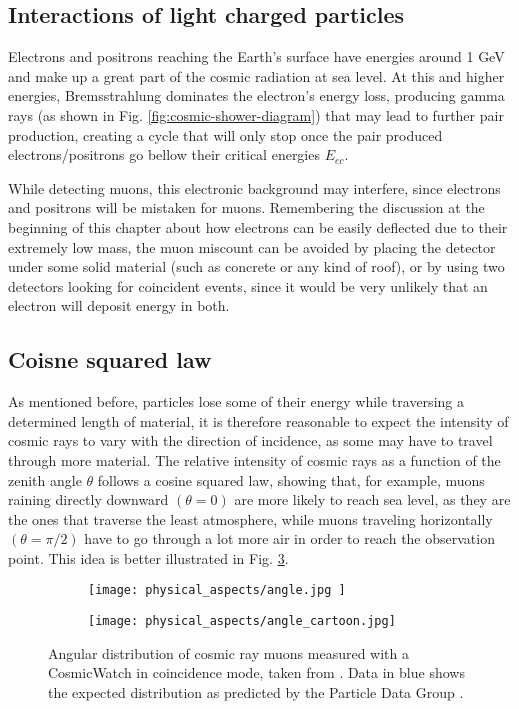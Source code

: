 \subsection{Interactions of light charged particles}

Electrons and positrons reaching the Earth's surface have energies around 1 \unit{\giga\eV} and make up a great part of the cosmic radiation at sea level. At this and higher energies, Bremsstrahlung dominates the electron's energy loss, producing gamma rays (as shown in Fig. \ref{fig:cosmic-shower-diagram}) that may lead to further pair production, creating a cycle that will only stop once the pair produced electrons/positrons go bellow their critical energies $E_{ec}$. 

While detecting muons, this electronic background may interfere, since electrons and positrons will be mistaken for muons. Remembering the discussion at the beginning of this chapter about how electrons can be easily deflected due to their extremely low mass, the muon miscount can be avoided by placing the detector under some solid material (such as concrete or any kind of roof), or by using two detectors looking for coincident events, since it would be very unlikely that an electron will deposit energy in both.

\subsection{Coisne squared law}

As mentioned before, particles lose some of their energy while traversing a determined length of material, it is therefore reasonable to expect the intensity of cosmic rays to vary with the direction of incidence, as some may have to travel through more material. The relative intensity of cosmic rays as a function of the zenith angle $\theta$ follows a cosine squared law, showing that, for example, muons raining directly downward $(\theta=0)$ are more likely to reach sea level, as they are the ones that traverse the least atmosphere, while muons traveling horizontally $(\theta=\pi/2)$ have to go through a lot more air in order to reach the observation point. This idea is better illustrated in Fig. \ref{fig:cosine_sqrd}.

\begin{figure}[H]
  \centering
  \begin{subfigure}[t]{0.48\textwidth}
    \texttt{[image: physical\_aspects/angle.jpg ]}
    \caption{\label{sfig:cosine_sqrd_law}}
  \end{subfigure}
  \medskip
  \centering
  \begin{subfigure}[t]{0.48\textwidth}
    \texttt{[image: physical\_aspects/angle\_cartoon.jpg]}
    \caption{\label{sfig:cosine_sqrd_cartoomn}}
  \end{subfigure}
  \caption{\label{fig:cosine_sqrd}Angular distribution of cosmic ray muons measured with a CosmicWatch in coincidence mode, taken from \cite{CosmicWatch}. Data in blue shows the expected distribution as predicted by the Particle Data Group \cite{PDG}.}
\end{figure}